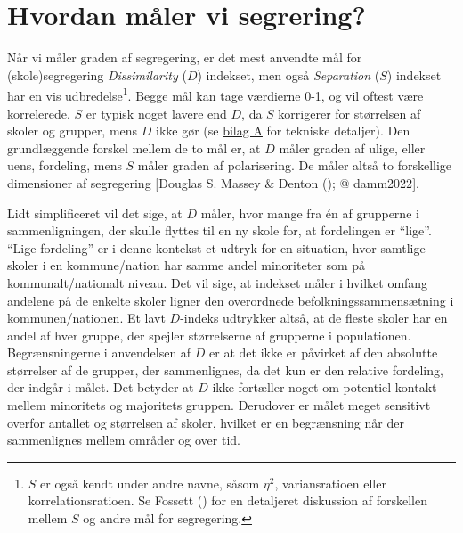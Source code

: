 \documentclass[
]{book}
\begin{document}
\section{Hvordan måler vi segrering?}\label{hvordan-muxe5ler-vi-segrering}

Når vi måler graden af segregering, er det mest anvendte mål for (skole)segregering \emph{Dissimilarity} (\(D\)) indekset, men også \emph{Separation} (\(S\)) indekset har en vis udbredelse\footnote{\(S\) er også kendt under andre navne, såsom \(\eta^2\), variansratioen eller korrelationsratioen. Se Fossett () for en detaljeret diskussion af forskellen mellem \(S\) og andre mål for segregering.}. Begge mål kan tage værdierne 0-1, og vil oftest være korrelerede. \(S\) er typisk noget lavere end \(D\), da \(S\) korrigerer for størrelsen af skoler og grupper, mens \(D\) ikke gør (se \hyperref[bilag1]{bilag A} for tekniske detaljer). Den grundlæggende forskel mellem de to mål er, at \(D\) måler graden af ulige, eller uens, fordeling, mens \(S\) måler graden af polarisering. De måler altså to forskellige dimensioner af segregering {[}Douglas S. Massey \& Denton (); @ damm2022{]}.

Lidt simplificeret vil det sige, at \(D\) måler, hvor mange fra én af grupperne i sammenligningen, der skulle flyttes til en ny skole for, at fordelingen er ``lige''. ``Lige fordeling'' er i denne kontekst et udtryk for en situation, hvor samtlige skoler i en kommune/nation har samme andel minoriteter som på kommunalt/nationalt niveau. Det vil sige, at indekset måler i hvilket omfang andelene på de enkelte skoler ligner den overordnede befolkningssammensætning i kommunen/nationen. Et lavt \(D\)-indeks udtrykker altså, at de fleste skoler har en andel af hver gruppe, der spejler størrelserne af grupperne i populationen. Begrænsningerne i anvendelsen af \(D\) er at det ikke er påvirket af den absolutte størrelser af de grupper, der sammenlignes, da det kun er den relative fordeling, der indgår i målet. Det betyder at \(D\) ikke fortæller noget om potentiel kontakt mellem minoritets og majoritets gruppen. Derudover er målet meget sensitivt overfor antallet og størrelsen af skoler, hvilket er en begrænsning når der sammenlignes mellem områder og over tid.
\end{document}
